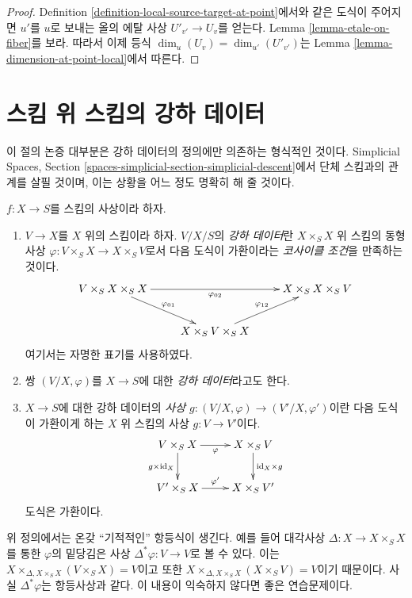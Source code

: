 \begin{proof}
Definition \ref{definition-local-source-target-at-point}에서와 같은
도식이 주어지면 $u'$를 $u$로 보내는 올의 에탈 사상
$U'_{v'} \to U_v$를 얻는다. Lemma \ref{lemma-etale-on-fiber}를 보라.
따라서 이제 등식 $\dim_u(U_v) = \dim_{u'}(U'_{v'})$는 Lemma
\ref{lemma-dimension-at-point-local}에서 따른다.
\end{proof}







\section{스킴 위 스킴의 강하 데이터}
\label{section-descent-datum}

\noindent
이 절의 논증 대부분은 강하 데이터의 정의에만 의존하는 형식적인
것이다. Simplicial Spaces, Section
\ref{spaces-simplicial-section-simplicial-descent}에서 단체 스킴과의
관계를 살필 것이며, 이는 상황을 어느 정도 명확히 해 줄 것이다.

\begin{definition}
\label{definition-descent-datum}
$f : X \to S$를 스킴의 사상이라 하자.
\begin{enumerate}
\item $V \to X$를 $X$ 위의 스킴이라 하자. $V/X/S$의
{\it 강하 데이터}란 $X \times_S X$ 위 스킴의 동형사상
$\varphi : V \times_S X \to X \times_S V$로서 다음 도식이 가환이라는
{\it 코사이클 조건}을 만족하는 것이다.
$$
\xymatrix{
V \times_S X \times_S X \ar[rd]^{\varphi_{01}} \ar[rr]_{\varphi_{02}} &
&
X \times_S X \times_S V\\
&
X \times_S V \times_S X \ar[ru]^{\varphi_{12}}
}
$$
여기서는 자명한 표기를 사용하였다.
\item 쌍 $(V/X, \varphi)$를 $X \to S$에 대한
{\it 강하 데이터}라고도 한다.
\item $X \to S$에 대한 강하 데이터의 {\it 사상
$g : (V/X, \varphi) \to (V'/X, \varphi')$}이란 다음 도식이 가환이게
하는 $X$ 위 스킴의 사상 $g : V \to V'$이다.
$$
\xymatrix{
V \times_S X \ar[r]_{\varphi} \ar[d]_{g \times \text{id}_X} &
X \times_S V \ar[d]^{\text{id}_X \times g} \\
V' \times_S X \ar[r]^{\varphi'} & X \times_S V'
}
$$
도식은 가환이다.
\end{enumerate}
\end{definition}

\noindent
위 정의에서는 온갖 ``기적적인'' 항등식이 생긴다. 예를 들어 대각사상
$\Delta : X \to X \times_S X$를 통한 $\varphi$의 밑당김은 사상
$\Delta^*\varphi : V \to V$로 볼 수 있다. 이는
$X \times_{\Delta, X \times_S X} (V \times_S X) = V$이고 또한
$X \times_{\Delta, X \times_S X} (X \times_S V) = V$이기 때문이다.
사실 $\Delta^*\varphi$는 항등사상과 같다. 이 내용이 익숙하지 않다면
좋은 연습문제이다.

